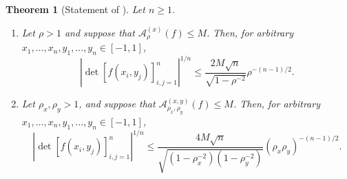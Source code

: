 \documentclass[11pt]{article}
\newtheorem*{restatedtheorem}{Theorem}
\theoremstyle{definition}
\theoremstyle{remark}
\newcommand{\abs}[1]{\left\lvert #1\right\rvert}
\begin{document}
\begin{restatedtheorem}[Statement of ]
Let $n\ge1$.
\begin{enumerate}
\item Let $\rho>1$ and suppose that
$\mathcal A_\rho^{(x)}(f)\le M$. Then, for arbitrary
$x_1,\ldots,x_n,y_1,\ldots,y_n\in [-1, 1]$,
\[
    \abs{\det[f(x_i,y_j)]_{i,j=1}^n}^{1/n}
    \le
    \frac{2M\sqrt n}{\sqrt{1-\rho^{-2}}}
    \rho^{-(n-1)/2}.
\]

\item Let $\rho_x,\rho_y>1$, and suppose that
$\mathcal A_{\rho_x,\rho_y}^{(x,y)}(f)\le M$. Then, for arbitrary
$x_1,\ldots,x_n,y_1,\ldots,y_n\in [-1, 1]$,
\[
    \abs{\det[f(x_i,y_j)]_{i,j=1}^n}^{1/n}
    \le
    \frac{4M\sqrt n}
         {\sqrt{(1-\rho_x^{-2})(1-\rho_y^{-2})}}
    (\rho_x\rho_y)^{-(n-1)/2}.
\]
\end{enumerate}
\end{restatedtheorem}
\end{document}
